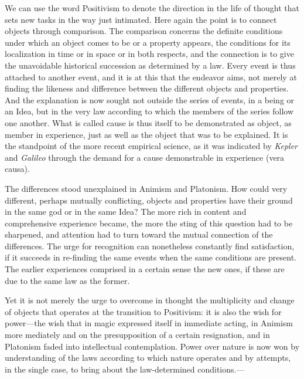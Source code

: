 \documentclass[12pt,a4paper]{book}
\newcommand{\opage}[1]{\marginnote{\footnotesize\textit{[#1]}}}
\begin{document}
We can use the word Positivism to denote the direction in the life of
thought that sets new tasks in the way just intimated. Here again the point
is to connect objects through comparison. The comparison concerns the
definite \opage{122}conditions under which an object comes to be or a property
appears, the conditions for its localization in time or in space or in both
respects, and the connection is to give the unavoidable historical
succession as determined by a law. Every event is thus attached to another
event, and it is at this that the endeavor aims, not merely at finding the
likeness and difference between the different objects and properties. And
the explanation is now sought not outside the series of events, in a being
or an Idea, but in the very law according to which the members of the series
follow one another. What is called cause is thus itself to be demonstrated
as object, as member in experience, just as well as the object that was to
be explained. It is the standpoint of the more recent empirical science, as
it was indicated by \emph{Kepler} and \emph{Galileo} through the demand for
a cause demonstrable in experience (vera causa).

The differences stood unexplained in Animism and Platonism. How could very
different, perhaps mutually conflicting, objects and properties have their
ground in the same god or in the same Idea? The more rich in content and
comprehensive experience became, the more the sting of this question had to
be sharpened, and attention had to turn toward the mutual connection of the
differences. The urge for recognition can nonetheless constantly find
satisfaction, if it succeeds in re-finding the same events when the same
conditions are present. The earlier experiences comprised in a certain
sense the new ones, if these are due to the same law as the former.

Yet it is not merely the urge to overcome in thought the multiplicity and
change of objects that operates at the transition to Positivism: it is also
the wish for power---the wish that in magic expressed itself in immediate
acting, in Animism more mediately and on the presupposition of a certain
resignation, and in Platonism faded into intellectual contemplation. Power
over nature is now won by understanding of the laws according to which
nature operates and by attempts, in the single case, to bring about the
law-determined conditions.---
\end{document}
